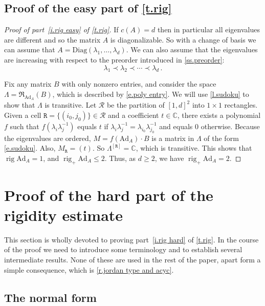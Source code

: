 \documentclass[10pt, a4paper]{amsart}
\theoremstyle{plain}
\theoremstyle{definition}
\theoremstyle{remark}
\theoremstyle{note}
\numberwithin{equation}{section}
\begin{document}
\subsection{Proof of the easy part of \cref{t.rig}}\label{ss.rig easy}

\begin{proof}[Proof of part~\ref{i.rig easy} of \cref{t.rig}]
If $c(A)=d$ then in particular all eigenvalues are different and so the matrix $A$ is diagonalizable.
So with a change of basis we can assume that
$A = {\mathrm{Diag}}(\lambda_1, \dots, \lambda_d)$.
We can also assume that the eigenvalues are 
increasing with respect to the preorder introduced in \cref{ss.preorder}:
$$
\lambda_1 \prec \lambda_2 \prec \cdots \prec \lambda_d \, .
$$

Fix any matrix $B$ with only nonzero entries,
and consider the space $\Lambda = {\mathfrak{R}}_{{\mathrm{Ad}}_A}(B)$,
which is described by \eqref{e.poly entry}.
We will use \cref{l.sudoku} to show that $\Lambda$ is transitive.
Let $\mathcal{R}$ be the partition of $[1,d]^2$ into $1 \times 1$ rectangles.
Given a cell ${\mathtt{R}} = \{(i_0,j_0)\} \in \mathcal{R}$ and a coefficient $t \in {\mathbb{C}}$,
there exists a polynomial $f$ such that 
$f(\lambda_i \lambda_j^{-1})$
equals $t$ if $\lambda_i \lambda_j^{-1} = \lambda_{i_0} \lambda_{j_0}^{-1}$
and equals $0$ otherwise.
Because the eigenvalues are ordered,
$M = f({\mathrm{Ad}}_A)\cdot B$ is a matrix in $\Lambda$ of the form \eqref{e.sudoku}.
Also, $M_{\mathtt{R}} = (t)$.
So $\Lambda^{[{\mathtt{R}}]} = {\mathbb{C}}$, which is transitive.
This shows that $\operatorname{rig} {\mathrm{Ad}}_A = 1$, and  $\operatorname{rig}_+ {\mathrm{Ad}}_A \leq 2$. 
Thus, as $d\geq 2$, we have $\operatorname{rig}_+ {\mathrm{Ad}}_A = 2$.
\end{proof}

\section{Proof of the hard part of the rigidity estimate}\label{s.rig proof}

This section is wholly devoted to proving part~\ref{i.rig hard} of \cref{t.rig}.
In the course of the proof we need to introduce some terminology 
and to establish several intermediate results.
None of these are used in the rest of the paper, apart form a simple consequence,
which is \cref{r.jordan type and acyc}.

\subsection{The normal form}\label{ss.normal form}
\end{document}
